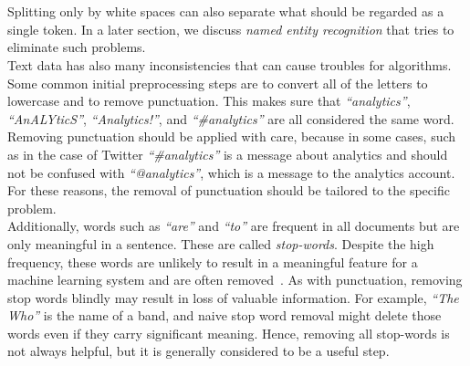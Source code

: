      \\
\\
Splitting only by white spaces can also separate what should be regarded as a single token. In a later section, we discuss \emph{named entity recognition} that tries to eliminate such problems. \\
\noindent
Text data has also many inconsistencies that can cause troubles for algorithms. Some common initial preprocessing steps are to convert all of the letters to lowercase and to remove punctuation.
This makes sure that \emph{``analytics''}, \emph{``AnALYticS''}, \emph{``Analytics!''}, and \emph{``\#analytics''} are all considered the same word. Removing punctuation should be applied with care, because in some cases, such as in the case of Twitter \emph{``\#analytics''} is a message about analytics and should not be confused with \emph{``@analytics''}, which is a message to the analytics account. For these reasons, the removal of punctuation should be tailored to the specific problem.\\
Additionally, words such as \emph{``are''} and \emph{``to''} are frequent in all documents but are only meaningful in a sentence. These are called \emph{stop-words}. Despite the high frequency, these words are unlikely to result in a meaningful feature for a machine learning system and are often removed~. As with punctuation, removing stop words blindly may result in loss of valuable information. For example, \emph{``The Who''} is the name of a band, and naive stop word removal might delete those words even if they carry significant meaning. Hence, removing all stop-words is not always helpful, but it is generally considered to be a useful step. 
